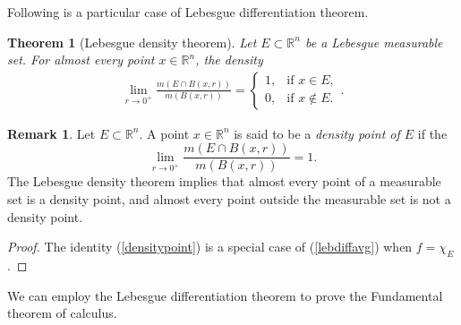 \documentclass{article}
\numberwithin{equation}{section}
\newcommand{\bbR}{\mathbb{R}}
\theoremstyle{plain}
\newtheorem{theorem}{Theorem}[section]
\theoremstyle{definition}
\newtheorem*{remark}{Remark}
\begin{document}
Following is a particular case of Lebesgue differentiation theorem.
\begin{theorem}[Lebesgue density theorem]
Let $E\subset\bbR^n$ be a Lebesgue measurable set. For almost every point $x\in \bbR^n$, the density
\begin{align}
	\lim_{r\to 0^+}\frac{m(E\cap B(x,r))}{m(B(x,r))}=\begin{cases}
		1, &\text{if $x\in E$},\\
		0, &\text{if $x\notin E$}.
	\end{cases}.\label{densitypoint}
\end{align}
\end{theorem}
\begin{remark}
Let $E\subset\bbR^n$. A point $x\in\bbR^n$ is said to be a \textit{density point of $E$} if the $$\lim_{r\to 0^+}\frac{m(E\cap B(x,r))}{m(B(x,r))}=1.$$ The Lebesgue density theorem implies that almost every point of a measurable set is a density point, and almost every point outside the measurable set is not a density point.
\end{remark}
\begin{proof}
The identity (\ref{densitypoint}) is a special case of (\ref{lebdiffavg}) when $f=\chi_E$.
\end{proof}

We can employ the Lebesgue differentiation theorem to prove the Fundamental theorem of calculus.
\end{document}
